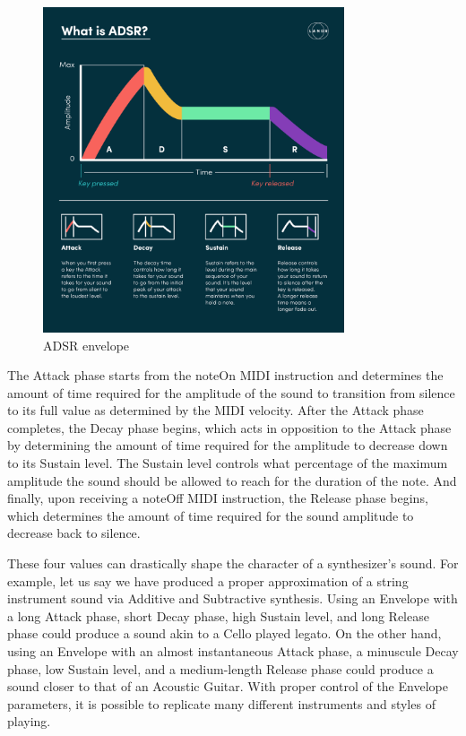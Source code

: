 \documentclass[a4paper,12pt]{report}
\begin{document}
\begin{figure}
    \centering
    \includegraphics[width=24em]{ADSRExplained.jpg}
    \caption{ADSR envelope}
    \label{fig:ADSRExplained}
\end{figure}

The Attack phase starts from the noteOn MIDI instruction and determines the amount of time required for the amplitude of the sound to transition from silence to its full value as determined by the MIDI velocity. After the Attack phase completes, the Decay phase begins, which acts in opposition to the Attack phase by determining the amount of time required for the amplitude to decrease down to its Sustain level. The Sustain level controls what percentage of the maximum amplitude the sound should be allowed to reach for the duration of the note. And finally, upon receiving a noteOff MIDI instruction, the Release phase begins, which determines the amount of time required for the sound amplitude to decrease back to silence.

These four values can drastically shape the character of a synthesizer's sound. For example, let us say we have produced a proper approximation of a string instrument sound via Additive and Subtractive synthesis. Using an Envelope with a long Attack phase, short Decay phase, high Sustain level, and long Release phase could produce a sound akin to a Cello played legato. On the other hand, using an Envelope with an almost instantaneous Attack phase, a minuscule Decay phase, low Sustain level, and a medium-length Release phase could produce a sound closer to that of an Acoustic Guitar. With proper control of the Envelope parameters, it is possible to replicate many different instruments and styles of playing.
\end{document}
